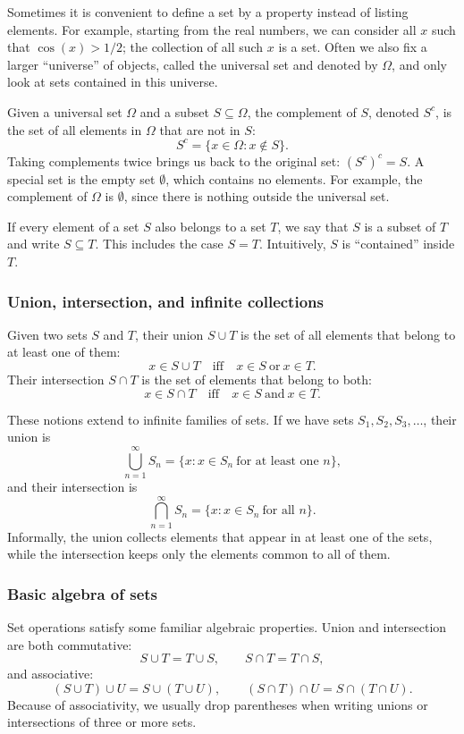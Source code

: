Sometimes it is convenient to define a set by a property instead of listing elements. For example, starting from the real numbers, we can consider all \(x\) such that \(\cos(x) > 1/2\); the collection of all such \(x\) is a set. Often we also fix a larger “universe” of objects, called the universal set and denoted by \(\Omega\), and only look at sets contained in this universe.

Given a universal set \(\Omega\) and a subset \(S \subseteq \Omega\), the complement of \(S\), denoted \(S^c\), is the set of all elements in \(\Omega\) that are not in \(S\):
\[
S^c = \{x \in \Omega : x \notin S\}.
\]
Taking complements twice brings us back to the original set: \((S^c)^c = S\). A special set is the empty set \(\emptyset\), which contains no elements. For example, the complement of \(\Omega\) is \(\emptyset\), since there is nothing outside the universal set.

If every element of a set \(S\) also belongs to a set \(T\), we say that \(S\) is a subset of \(T\) and write \(S \subseteq T\). This includes the case \(S = T\). Intuitively, \(S\) is “contained” inside \(T\).

\subsubsection{Union, intersection, and infinite collections}

Given two sets \(S\) and \(T\), their union \(S \cup T\) is the set of all elements that belong to at least one of them:
\[
x \in S \cup T \quad \text{iff} \quad x \in S \ \text{or} \ x \in T.
\]
Their intersection \(S \cap T\) is the set of elements that belong to both:
\[
x \in S \cap T \quad \text{iff} \quad x \in S \ \text{and} \ x \in T.
\]

These notions extend to infinite families of sets. If we have sets \(S_1, S_2, S_3, \dots\), their union is
\[
\bigcup_{n=1}^\infty S_n = \{x : x \in S_n \ \text{for at least one } n\},
\]
and their intersection is
\[
\bigcap_{n=1}^\infty S_n = \{x : x \in S_n \ \text{for all } n\}.
\]
Informally, the union collects elements that appear in at least one of the sets, while the intersection keeps only the elements common to all of them.

\subsubsection{Basic algebra of sets}

Set operations satisfy some familiar algebraic properties. Union and intersection are both commutative:
\[
S \cup T = T \cup S, \qquad S \cap T = T \cap S,
\]
and associative:
\[
(S \cup T) \cup U = S \cup (T \cup U), \qquad (S \cap T) \cap U = S \cap (T \cap U).
\]
Because of associativity, we usually drop parentheses when writing unions or intersections of three or more sets.

